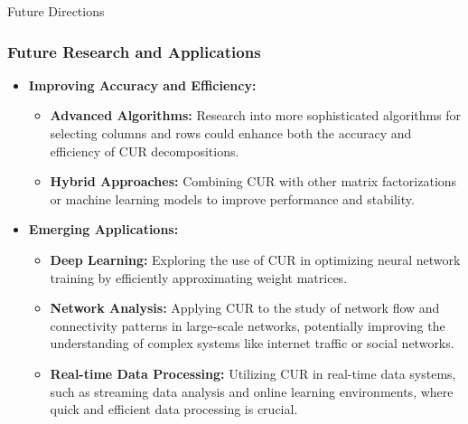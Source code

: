 \documentclass[pdf]{beamer}
\begin{document}
\begin{frame}{Future Directions}
    \frametitle{Future Research and Applications}
    \begin{itemize}
        \item \textbf{Improving Accuracy and Efficiency:}
            \begin{itemize}
                \item \textbf{Advanced Algorithms:} Research into more sophisticated algorithms for selecting columns and rows could enhance both the accuracy and efficiency of CUR decompositions.
                \item \textbf{Hybrid Approaches:} Combining CUR with other matrix factorizations or machine learning models to improve performance and stability.
            \end{itemize}
        \item \textbf{Emerging Applications:}
            \begin{itemize}
                \item \textbf{Deep Learning:} Exploring the use of CUR in optimizing neural network training by efficiently approximating weight matrices.
                \item \textbf{Network Analysis:} Applying CUR to the study of network flow and connectivity patterns in large-scale networks, potentially improving the understanding of complex systems like internet traffic or social networks.
                \item \textbf{Real-time Data Processing:} Utilizing CUR in real-time data systems, such as streaming data analysis and online learning environments, where quick and efficient data processing is crucial.
            \end{itemize}
    \end{itemize}
\end{frame}
\end{document}
